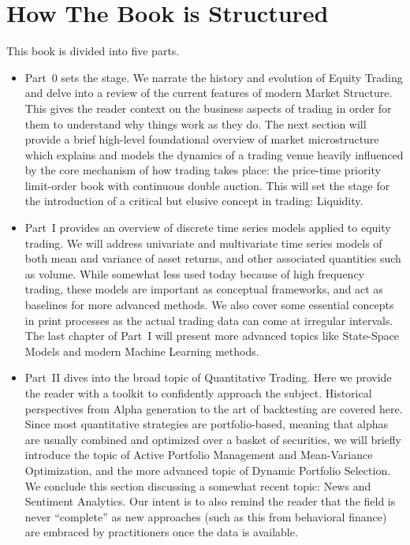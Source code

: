 \section{How The Book is Structured}

This book is divided into five parts. 

\begin{itemize}
\item Part~0 sets the stage. We narrate the history and evolution of Equity Trading and delve into a review of the current features of modern Market Structure. This gives the reader context on the business aspects of trading in order for them to understand why things work as they do. The next section will provide a brief high-level foundational overview of market microstructure which explains and models the dynamics of a trading venue heavily influenced by the core mechanism of how trading takes place: the price-time priority limit-order book with continuous double auction. This will set the stage for the introduction of a critical but elusive concept in trading: Liquidity.

\item Part~I provides an overview of discrete time series models applied to equity trading. We will address univariate and multivariate time series models of both mean and variance of asset returns, and other associated quantities such as volume. While somewhat less used today because of high frequency trading, these models are important  as conceptual frameworks, and act as baselines for more advanced methods. We also cover some essential concepts in print processes as the actual trading data can come at irregular intervals. The last chapter of Part~I will present more advanced topics like State-Space Models and modern Machine Learning methods.

\item Part~II dives into the broad topic of Quantitative Trading. Here we provide the reader with a toolkit to confidently approach the subject. Historical perspectives from Alpha generation to the art of backtesting are covered here. Since most quantitative strategies are portfolio-based, meaning that alphas are usually combined  and optimized over a basket of securities, we will briefly introduce the topic of Active Portfolio Management and Mean-Variance Optimization, and the more advanced topic of Dynamic Portfolio Selection. We conclude this section discussing a somewhat recent topic:  News and Sentiment Analytics. Our intent is to also remind the reader that the field is never ``complete'' as new approaches (such as this from behavioral finance) are embraced by practitioners once the data is available.


\end{itemize}

